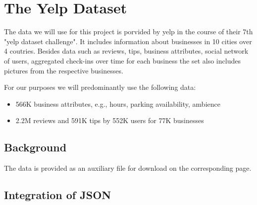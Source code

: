 \section{The Yelp Dataset} %
\label{cha:yelp}
The data we will use for this project is porvided by yelp in the course of their 7th "yelp dataset challenge". It includes information about businesses in 10 cities over 4 coutries. Besides data such as reviews, tips, business attributes, social network of users, aggregated check-ins over time for each business the set also includes pictures from the respective businesses. 

For our purposes we will predominantly use the following data: 
\begin{itemize}
\item566K business attributes, e.g., hours, parking availability, ambience
\item2.2M reviews and 591K tips by 552K users for 77K businesses
\end{itemize}

\subsection{Background} %
\label{sec:background}
The data is provided as an auxiliary file for download on the corresponding page.

\subsection{Integration of JSON}
\label{sec:integration}
